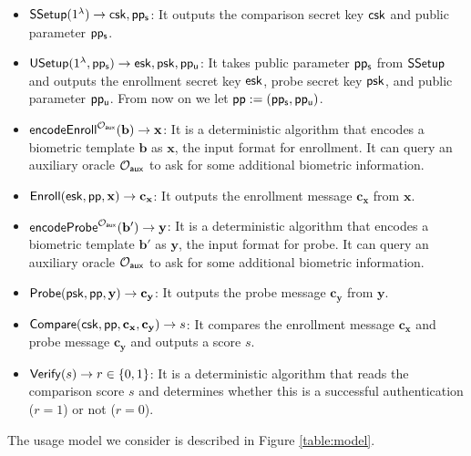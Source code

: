 \begin{itemize}

	\item ${\sf SSetup}(1^\lambda) \to {\sf csk}, {\sf pp_s}$: It outputs the comparison secret key ${\sf csk}$ and public parameter ${\sf pp_s}$.

	\item ${\sf USetup}(1^\lambda, {\sf pp_s}) \to {\sf esk}, {\sf psk}, {\sf pp_u}$: It takes public parameter ${\sf pp_s}$ from ${\sf SSetup}$ and outputs the enrollment secret key ${\sf esk}$, probe secret key ${\sf psk}$, and public parameter ${\sf pp_u}$. From now on we let ${\sf pp} := ({\sf pp_s}, {\sf pp_u})$.

	\item ${\sf encodeEnroll}^{\mathcal{O}_{\sf aux}}({\mathbf{b}}) \to \mathbf{x}$: It is a deterministic algorithm that encodes a biometric template $\mathbf{b}$ as $\mathbf{x}$, the input format for enrollment. It can query an auxiliary oracle $\mathcal{O}_{\sf aux}$ to ask for some additional biometric information. 

	\item ${\sf Enroll}({\sf esk}, {\sf pp}, \mathbf{x}) \to \mathbf{c_x}$: It outputs the enrollment message $\mathbf{c_x}$ from $\mathbf{x}$.

	\item ${\sf encodeProbe}^{\mathcal{O}_{\sf aux}}({\mathbf{b'}}) \to \mathbf{y}$: It is a deterministic algorithm that encodes a biometric template $\mathbf{b'}$ as $\mathbf{y}$, the input format for probe. It can query an auxiliary oracle $\mathcal{O}_{\sf aux}$ to ask for some additional biometric information. 

	\item ${\sf Probe}({\sf psk}, {\sf pp}, \mathbf{y}) \to \mathbf{c_y}$: It outputs the probe message $\mathbf{c_y}$ from $\mathbf{y}$.

	\item ${\sf Compare}({\sf csk}, {\sf pp}, \mathbf{c_x}, \mathbf{c_y)} \to s$: It compares the enrollment message $\mathbf{c_x}$ and probe message $\mathbf{c_y}$ and outputs a score $s$.

	\item ${\sf Verify}(s) \to r \in \{0,1\}$: It is a deterministic algorithm that reads the comparison score $s$ and determines whether this is a successful authentication ($r = 1$) or not ($r = 0$).

\end{itemize}


The usage model we consider is described in Figure \ref{table:model}.


